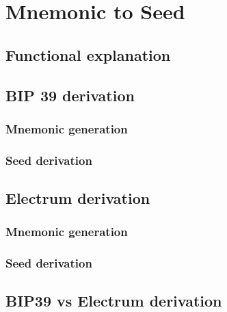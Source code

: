 
\chapter{Mnemonic to Seed} %

\label{bip32} %




\section{Functional explanation}

\section{BIP 39 derivation}

\subsection{Mnemonic generation}

\subsection{Seed derivation}

\section{Electrum derivation}

\subsection{Mnemonic generation}

\subsection{Seed derivation}

\section{BIP39 vs Electrum derivation}
